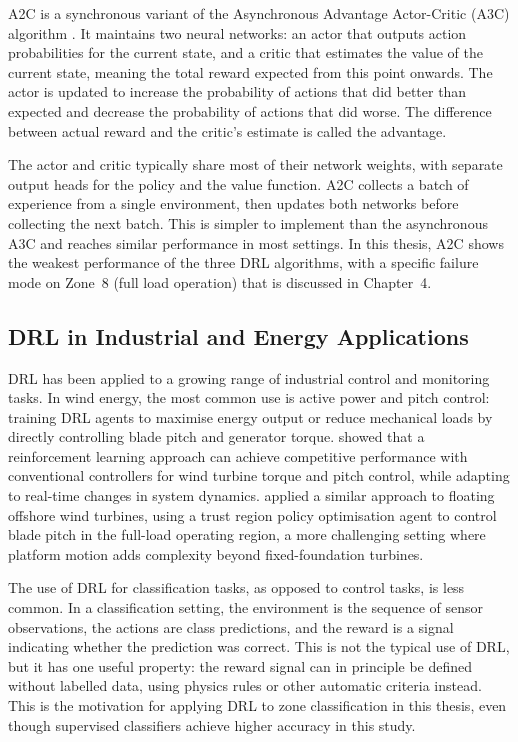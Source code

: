 A2C is a synchronous variant of the Asynchronous Advantage Actor-Critic (A3C) algorithm
\citep{mnih2016}. It maintains two neural networks: an actor that outputs action
probabilities for the current state, and a critic that estimates the value of the current
state, meaning the total reward expected from this point onwards. The actor is updated to
increase the probability of actions that did better than expected and decrease the
probability of actions that did worse. The difference between actual reward and the
critic's estimate is called the advantage.

The actor and critic typically share most of their network weights, with separate output
heads for the policy and the value function. A2C collects a batch of experience from a
single environment, then updates both networks before collecting the next batch. This is
simpler to implement than the asynchronous A3C and reaches similar performance in most
settings. In this thesis, A2C shows the weakest performance of the three DRL algorithms,
with a specific failure mode on Zone~8 (full load operation) that is discussed in
Chapter~4.

\subsection{DRL in Industrial and Energy Applications}
\label{subsec:bg:drl:industrial}

DRL has been applied to a growing range of industrial control and monitoring tasks. In
wind energy, the most common use is active power and pitch control: training DRL agents
to maximise energy output or reduce mechanical loads by directly controlling blade pitch
and generator torque. \citet{xie2023} showed that a reinforcement learning approach can achieve
competitive performance with conventional controllers for wind turbine torque and
pitch control, while adapting to real-time changes in system dynamics.
\citet{didier2022} applied a similar approach to floating offshore wind turbines, using a
trust region policy optimisation agent to control blade pitch in the full-load operating
region, a more challenging setting where platform motion adds complexity beyond
fixed-foundation turbines.

The use of DRL for classification tasks, as opposed to control tasks, is less common. In
a classification setting, the environment is the sequence of sensor observations, the
actions are class predictions, and the reward is a signal indicating whether the
prediction was correct. This is not the typical use of DRL, but it has one useful
property: the reward signal can in principle be defined without labelled data, using
physics rules or other automatic criteria instead. This is the motivation for applying
DRL to zone classification in this thesis, even though supervised classifiers achieve
higher accuracy in this study.

